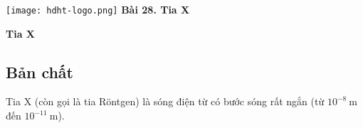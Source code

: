 \newcommand{\chapter}[2][]{
	\newcommand{\chapname}{#2}
	\begin{flushleft}
		\begin{minipage}[t]{\linewidth}
			\texttt{[image: hdht-logo.png]}
			\hspace{0pt}	
			\sffamily\bfseries\large Bài  28. Tia X
			\begin{flushleft}
				\huge\bfseries #1
			\end{flushleft}
		\end{minipage}
	\end{flushleft}
	\vspace{1cm}
	\normalfont\normalsize
}
\chapter[Tia X]{Tia X}

\subsection{Bản chất}

Tia X (còn gọi là tia R\"ontgen) là sóng điện từ có bước sóng rất ngắn (từ $10^{-8}\ \text{m}$ đến $10^{-11}\ \text{m}$).

